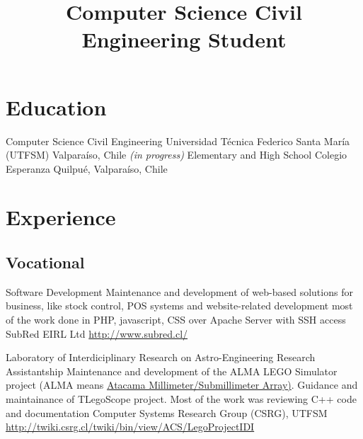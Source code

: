 \documentclass[11pt,a4paper]{moderncv}
\title{Computer Science Civil Engineering Student}
\begin{document}
\maketitle



	   
\section{Education}

        {Computer Science Civil Engineering}
        {Universidad Técnica Federico Santa María (UTFSM)}
        {Valparaíso, Chile}
        {\emph{(in progress)}}
        {}
        {Elementary and High School}
        {Colegio Esperanza}
        {Quilpué, Valparaíso, Chile}
        {}{}

\section{Experience}
\subsection{Vocational}
        
        {Software Development}
        {Maintenance and development of web-based solutions for business, like stock control, POS systems and website-related development}
        {most of the work done in PHP, javascript, CSS over Apache Server with SSH access}
        {SubRed EIRL Ltd}
        {\url{http://www.subred.cl/}}

        {Laboratory of Interdiciplinary Research on Astro-Engineering Research Assistantship}
        {Maintenance and development of the ALMA LEGO Simulator project (ALMA means \href{http://www.alma.cl/}{Atacama Millimeter/Submillimeter Array)}. Guidance and maintainance of TLegoScope project.}
        {Most of the work was reviewing C++ code and documentation}
        {Computer Systems Research Group (CSRG), UTFSM}
        {\url{http://twiki.csrg.cl/twiki/bin/view/ACS/LegoProjectIDI}}
\end{document}
